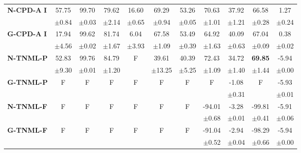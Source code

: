 \begin{table}[ht]
\begin{tabular}{lcccccccccc}
\midrule
\textbf{N-CPD-A} \textbf{I} & 57.75 & 99.70 & 79.62 & 16.60 & 69.29 & 53.26 & 70.63 & 37.92 & 66.58 & 1.27 \\
 & $\pm$0.84 & $\pm$0.03 & $\pm$2.14 & $\pm$0.65 & $\pm$0.94 & $\pm$0.05 & $\pm$1.01 & $\pm$1.21 & $\pm$0.28 & $\pm$0.24 \\
\midrule
\textbf{G-CPD-A} \textbf{I} & 17.94 & 99.62 & 81.74 & 6.04 & 67.58 & 53.49 & 64.92 & 40.09 & 67.04 & 0.38 \\
 & $\pm$4.56 & $\pm$0.02 & $\pm$1.67 & $\pm$3.93 & $\pm$1.09 & $\pm$0.39 & $\pm$1.63 & $\pm$0.63 & $\pm$0.09 & $\pm$0.02 \\
\midrule
\midrule
\textbf{N-TNML-P} & 52.83 & 99.76 & 84.79 & F & 39.61 & 40.39 & 72.43 & 34.72 & \textbf{69.85} & -5.94 \\
 & $\pm$9.30 & $\pm$0.01 & $\pm$1.20 &  & $\pm$13.25 & $\pm$5.25 & $\pm$1.09 & $\pm$1.40 & $\pm$1.44 & $\pm$0.00 \\
\midrule
\textbf{G-TNML-P} & F & F & F & F & F & F & F & -1.08 & F & -5.93 \\
 &  &  &  &  &  &  &  & $\pm$0.31 &  & $\pm$0.01 \\
\midrule
\textbf{N-TNML-F} & F & F & F & F & F & F & -94.01 & -3.28 & -99.81 & -5.91 \\
 &  &  &  &  &  &  & $\pm$0.68 & $\pm$0.01 & $\pm$0.41 & $\pm$0.06 \\
\midrule
\textbf{G-TNML-F} & F & F & F & F & F & F & -91.04 & -2.94 & -98.29 & -5.94 \\
 &  &  &  &  &  &  & $\pm$0.52 & $\pm$0.04 & $\pm$0.66 & $\pm$0.00 \\
\bottomrule
\end{tabular}
\end{table}